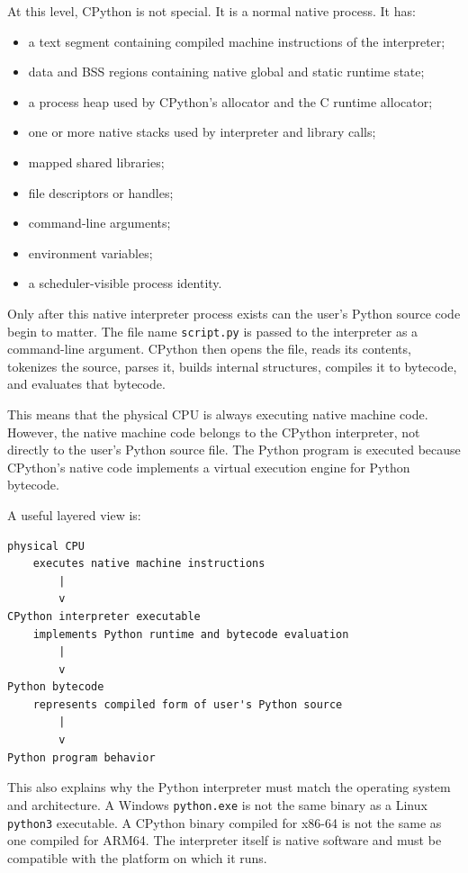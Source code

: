 At this level, CPython is not special. It is a normal native process. It has:

\begin{itemize}
    \item a text segment containing compiled machine instructions of the interpreter;
    \item data and BSS regions containing native global and static runtime state;
    \item a process heap used by CPython's allocator and the C runtime allocator;
    \item one or more native stacks used by interpreter and library calls;
    \item mapped shared libraries;
    \item file descriptors or handles;
    \item command-line arguments;
    \item environment variables;
    \item a scheduler-visible process identity.
\end{itemize}

Only after this native interpreter process exists can the user's Python source code begin to matter. The file name \texttt{script.py} is passed to the interpreter as a command-line argument. CPython then opens the file, reads its contents, tokenizes the source, parses it, builds internal structures, compiles it to bytecode, and evaluates that bytecode.

This means that the physical CPU is always executing native machine code. However, the native machine code belongs to the CPython interpreter, not directly to the user's Python source file. The Python program is executed because CPython's native code implements a virtual execution engine for Python bytecode.

A useful layered view is:

\begin{verbatim}
physical CPU
    executes native machine instructions
        |
        v
CPython interpreter executable
    implements Python runtime and bytecode evaluation
        |
        v
Python bytecode
    represents compiled form of user's Python source
        |
        v
Python program behavior
\end{verbatim}

This also explains why the Python interpreter must match the operating system and architecture. A Windows \texttt{python.exe} is not the same binary as a Linux \texttt{python3} executable. A CPython binary compiled for x86-64 is not the same as one compiled for ARM64. The interpreter itself is native software and must be compatible with the platform on which it runs.

